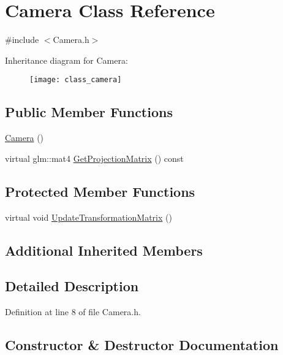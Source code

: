 \hypertarget{class_camera}{}\section{Camera Class Reference}
\label{class_camera}


{\ttfamily \#include $<$Camera.\+h$>$}

Inheritance diagram for Camera\+:\begin{figure}[H]
\begin{center}
\leavevmode
\texttt{[image: class\_camera]}
\end{center}
\end{figure}
\subsection*{Public Member Functions}
\begin{DoxyCompactItemize}
\item 
\hyperlink{class_camera_a01f94c3543f56ede7af49dc778f19331}{Camera} ()
\item 
virtual glm\+::mat4 \hyperlink{class_camera_a497efa3119ab4ae679d29badf6f25682}{Get\+Projection\+Matrix} () const 
\end{DoxyCompactItemize}
\subsection*{Protected Member Functions}
\begin{DoxyCompactItemize}
\item 
virtual void \hyperlink{class_camera_aea640c892a3807671d8ca49616d96eda}{Update\+Transformation\+Matrix} ()
\end{DoxyCompactItemize}
\subsection*{Additional Inherited Members}


\subsection{Detailed Description}


Definition at line 8 of file Camera.\+h.



\subsection{Constructor \& Destructor Documentation}
\hypertarget{class_camera_a01f94c3543f56ede7af49dc778f19331}{}
